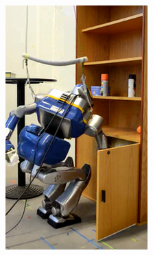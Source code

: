 \begin{figure}
\begin{subfigure}{0.19\columnwidth}
    \includegraphics[width = \columnwidth]
                    {src/chap3-optimal-motion-planning/figure/shelves-4.png}
    \label{shelves-4}
  \end{subfigure}
  \begin{subfigure}{0.19\columnwidth}
    \centering

\end{subfigure}
\end{figure}
